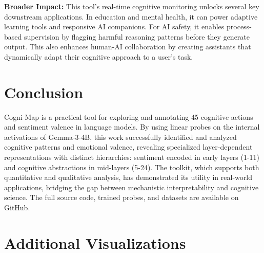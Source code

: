 \documentclass[letterpaper]{article}
\begin{document}
\textbf{Broader Impact:} This tool's real-time cognitive monitoring unlocks several key downstream applications. In education and mental health, it can power adaptive learning tools and responsive AI companions. For AI safety, it enables process-based supervision by flagging harmful reasoning patterns before they generate output. This also enhances human-AI collaboration by creating assistants that dynamically adapt their cognitive approach to a user's task.

\section{Conclusion}

Cogni Map is a practical tool for exploring and annotating 45 cognitive actions and sentiment valence in language models. By using linear probes on the internal activations of Gemma-3-4B, this work successfully identified and analyzed cognitive patterns and emotional valence, revealing specialized layer-dependent representations with distinct hierarchies: sentiment encoded in early layers (1-11) and cognitive abstractions in mid-layers (5-24). The toolkit, which supports both quantitative and qualitative analysis, has demonstrated its utility in real-world applications, bridging the gap between mechanistic interpretability and cognitive science. The full source code, trained probes, and datasets are available on GitHub.



\clearpage
\appendix

\section{Additional Visualizations}
\end{document}
